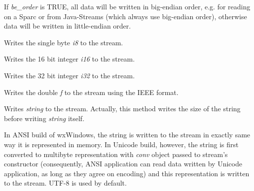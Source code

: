 
If {\it be\_order} is TRUE, all data will be written in big-endian
order, e.g. for reading on a Sparc or from Java-Streams (which
always use big-endian order), otherwise data will be written in
little-endian order.
 


Writes the single byte {\it i8} to the stream.



Writes the 16 bit integer {\it i16} to the stream.



Writes the 32 bit integer {\it i32} to the stream.



Writes the double {\it f} to the stream using the IEEE format.

\label{wxdataoutputstreamwritestring}


Writes {\it string} to the stream. Actually, this method writes the size of
the string before writing {\it string} itself.

In ANSI build of wxWindows, the string is written to the stream in exactly
same way it is represented in memory. In Unicode build, however, the string
is first converted to multibyte representation with {\it conv} object passed
to stream's constructor (consequently, ANSI application can read data 
written by Unicode application, as long as they agree on encoding) and this
representation is written to the stream. UTF-8 is used by default.

